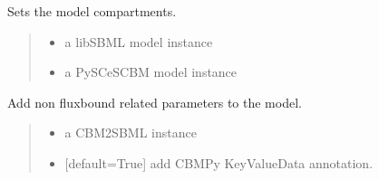 \documentclass[letterpaper,12pt,english]{sphinxmanual}
\begin{document}
\begin{fulllineitems}
\label{\detokenize{api/io:cbmpy.CBXML.sbml_setCompartmentsL3}}
\pysigstartsignatures
\pysiglinewithargsret
{}
{\sphinxparamcomma {}}
{}
\pysigstopsignatures
\sphinxAtStartPar
Sets the model compartments.
\begin{quote}\begin{description}
\begin{itemize}
\item {} 
\sphinxAtStartPar
{} \textendash{} a libSBML model instance

\item {} 
\sphinxAtStartPar
{} \textendash{} a PySCeSCBM model instance

\end{itemize}

\end{description}\end{quote}

\end{fulllineitems}


\begin{fulllineitems}
\label{\detokenize{api/io:cbmpy.CBXML.sbml_setParametersL3Fbc}}
\pysigstartsignatures
\pysiglinewithargsret
{}
{\sphinxparamcomma {}\sphinxparamcomma {}}
{}
\pysigstopsignatures
\sphinxAtStartPar
Add non fluxbound related parameters to the model.
\begin{quote}\begin{description}
\begin{itemize}
\item {} 
\sphinxAtStartPar
{} \textendash{} a CBM2SBML instance

\item {} 
\sphinxAtStartPar
{} \textendash{} {[}default=True{]} add CBMPy KeyValueData annotation.

\end{itemize}

\end{description}\end{quote}

\end{fulllineitems}
\end{document}
